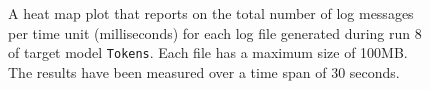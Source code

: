 \begin{figure}[htbp]
\centering
\begin{minipage}{1\textwidth}
  \centering
\end{minipage}
\caption{A heat map plot that reports on the total number of log messages per time unit (milliseconds) for each log file generated during run 8 of target model \texttt{Tokens}. Each file has a maximum size of 100MB. The results have been measured over a time span of 30 seconds.}
\label{figure:throughput_sum_tokens_8}
\end{figure}